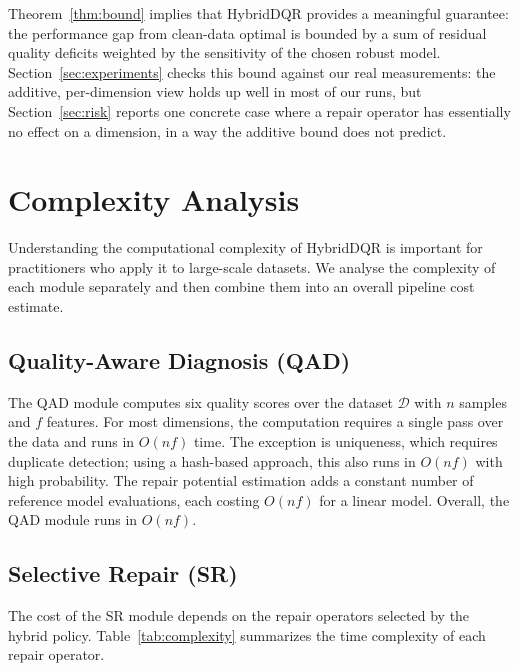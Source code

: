 \documentclass[runningheads]{llncs}
\begin{document}
Theorem~\ref{thm:bound} implies that HybridDQR provides a
meaningful guarantee: the performance gap from clean-data optimal
is bounded by a sum of residual quality deficits weighted by the
sensitivity of the chosen robust model.
Section~\ref{sec:experiments} checks this bound against our real
measurements: the additive, per-dimension view holds up well
in most of our runs, but Section~\ref{sec:risk} reports one
concrete case where a repair operator has essentially no effect
on a dimension, in a way the additive bound does not predict.

\section{Complexity Analysis}
\label{sec:complexity}

Understanding the computational complexity of HybridDQR is
important for practitioners who apply it to large-scale datasets.
We analyse the complexity of each module separately and then
combine them into an overall pipeline cost estimate.

\subsection{Quality-Aware Diagnosis (QAD)}

The QAD module computes six quality scores over the dataset
$\mathcal{D}$ with $n$ samples and $f$ features.
For most dimensions, the computation requires a single pass over
the data and runs in $O(nf)$ time.
The exception is uniqueness, which requires duplicate detection;
using a hash-based approach, this also runs in $O(nf)$ with
high probability.
The repair potential estimation adds a constant number of
reference model evaluations, each costing $O(nf)$ for a
linear model.
Overall, the QAD module runs in $O(nf)$.

\subsection{Selective Repair (SR)}

The cost of the SR module depends on the repair operators
selected by the hybrid policy.
Table~\ref{tab:complexity} summarizes the time complexity of
each repair operator.
\end{document}
